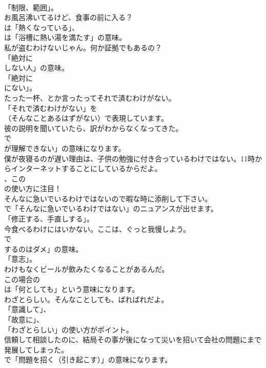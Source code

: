 \documentclass[8pt]{extreport}
\begin{document}
\begin{CJK}{UTF8}{min}
\\	「制限、範囲」。	
\\	お風呂沸いてるけど、食事の前に入る？ 
\\	は「熱くなっている」、
\\	は「浴槽に熱い湯を満たす」の意味。	
\\	私が盗むわけないじゃん。何か証拠でもあるの？ 
\\	「絶対に 
\\	しない人」の意味。
\\	「絶対に 
\\	にない」。	
\\	たった一杯、とか言ったってそれで済むわけがない。 
\\	「それで済むわけがない」を 
\\	（そんなことあるはずがない）で表現しています。	
\\	彼の説明を聞いていたら、訳がわからなくなってきた。 
\\	で
\\	が理解できない」の意味になります。	
\\	僕が夜寝るのが遅い理由は、子供の勉強に付き合っているわけではない。11時からインターネットすることにしているからだよ。 
\\	、この
\\	の使い方に注目！	
\\	そんなに急いでいるわけではないので暇な時に添削して下さい。 
\\	で「そんなに急いでいるわけではない」のニュアンスが出せます。
\\	「修正する、手直しする」。	
\\	今食べるわけにはいかない。ここは、ぐっと我慢しよう。 
\\	で
\\	するのはダメ」の意味。
\\	「意志」。	
\\	わけもなくビールが飲みたくなることがあるんだ。 
\\	この場合の
\\	は「何としても」という意味になります。	
\\	わざとらしい。そんなことしても、ばればれだよ。 
\\	「意識して」、
\\	「故意に」、
\\	「わざとらしい」の使い方がポイント。	
\\	信頼して相談したのに、結局その事が後になって災いを招いて会社の問題にまで発展してしまった。 
\\	で「問題を招く（引き起こす）」の意味になります。

\end{CJK}
\end{document}
